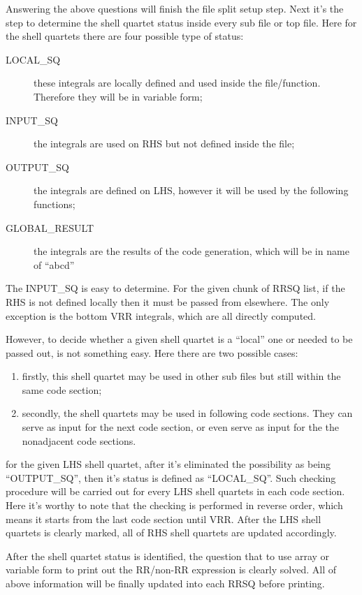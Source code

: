 Answering the above questions will finish the file split setup step. Next it's the step
to determine the shell quartet status inside every sub file or top file. Here for the 
shell quartets there are four possible type of status:
\begin{description}
 \item [LOCAL\_SQ] these integrals are locally defined and used inside the file/function.
 Therefore they will be in variable form;
 \item [INPUT\_SQ] the integrals are used on RHS but not defined inside the file;
 \item [OUTPUT\_SQ] the integrals are defined on LHS, however it will be used by the 
 following functions;
 \item [GLOBAL\_RESULT] the integrals are the results of the code generation, which will be 
 in name of ``abcd''
\end{description}

The INPUT\_SQ is easy to determine. For the given chunk of RRSQ list, if the RHS is not defined
locally then it must be passed from elsewhere. The only exception is the bottom VRR integrals,
which are all directly computed.

However, to decide whether a given shell quartet is a ``local'' one or needed to be passed out,
is not something easy. Here there are two possible cases:
\begin{enumerate}
 \item firstly, this shell quartet may be used in other sub files but still within the same 
 code section;
 \item secondly, the shell quartets may be used in following code sections. They can serve
 as input for the next code section, or even serve as input for the the nonadjacent code 
 sections.
\end{enumerate}
for the given LHS shell quartet, after it's eliminated the possibility as being ``OUTPUT\_SQ'',
then it's status is defined as ``LOCAL\_SQ''. Such checking procedure will be carried out for every 
LHS shell quartets in each code section. Here it's worthy to note that the checking is 
performed in reverse order, which means it starts from the last code section until VRR.
After the LHS shell quartets is clearly marked, all of RHS shell quartets are updated
accordingly. 

After the shell quartet status is identified, the question that to use array or variable
form to print out the RR/non-RR expression is clearly solved. All of above information
will be finally updated into each RRSQ before printing.

